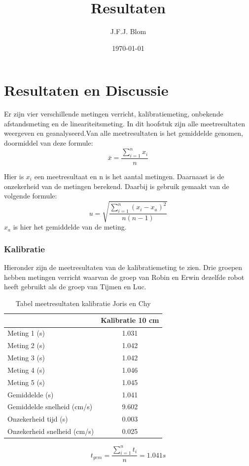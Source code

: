 \documentclass{report}
\title{Resultaten}
\author{J.F.J. Blom}
\date{\today}
\begin{document}
\chapter{Resultaten en Discussie}
Er zijn vier verschillende metingen verricht, kalibratiemeting, onbekende afstandsmeting en de lineariteitsmeting. In dit hoofstuk zijn alle meetresultaten weergeven en geanalyseerd.Van alle meetresultaten is het gemiddelde genomen, doormiddel van deze formule:
\begin{equation}
\bar{x}=\frac{\sum_{i=1}^{n}x_i}{n}
\end{equation}

Hier is $x_i$ een meetresultaat en n is het aantal metingen. 
Daarnaast is de onzekerheid van de metingen berekend. Daarbij is gebruik gemaakt van de volgende formule:
\begin{equation}
u=\sqrt{\frac{\sum_{i=1}^{n}( x_i-x_a)^2}{n(n-1)}}
\end{equation}
$x_a$ is hier het gemiddelde van de meting.
\subsection*{Kalibratie}
Hieronder zijn de meetresultaten van de kalibratiemeting te zien. Drie groepen hebben metingen verricht waarvan de groep van Robin en Erwin dezelfde robot heeft gebruikt als de groep van Tijmen en Luc.

\begin{table}
 \centering
\begin{tabular}{| l| c|}
\hline
    & Kalibratie 10 cm \\
\hline
   Meting 1 (s) & 1.031 \\
\hline
   Meting 2 (s) & 1.042 \\
\hline
   Meting 3 (s) & 1.042 \\
\hline
   Meting 4 (s) & 1.046 \\
\hline
   Meting 5 (s) & 1.045 \\
\hline
   Gemiddelde (s) & 1.041 \\
\hline
   Gemiddelde snelheid (cm/s) & 9.602 \\
\hline
   Onzekerheid tijd (s) & 0.003 \\
\hline
   Onzekerheid snelheid (cm/s) & 0.025 \\
\hline
\end{tabular}
\caption{Tabel meetresultaten kalibratie Joris en Chy}
\end{table}

$$ t_{gem}=\frac{\sum_{i=1}^{n}t_i}{n} = 1.041 s$$
\end{document}
